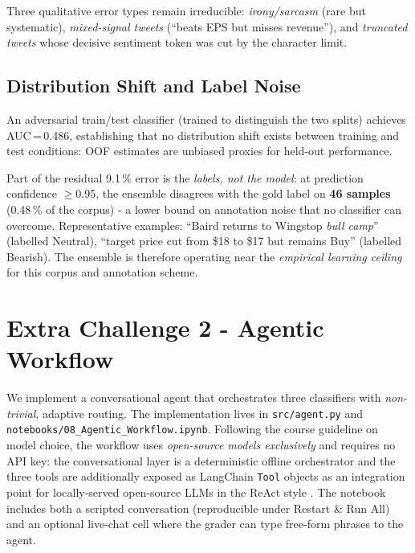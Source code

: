 \documentclass[11pt,a4paper]{article}
\begin{document}
Three qualitative error types remain irreducible: \emph{irony/sarcasm} (rare but
systematic), \emph{mixed-signal tweets} (``beats EPS but misses revenue''),
and \emph{truncated tweets} whose decisive sentiment token was cut by the character limit.

\subsection{Distribution Shift and Label Noise}
An adversarial train/test classifier (trained to distinguish the two splits) achieves
AUC\,=\,0.486, establishing that no distribution shift exists between training and test
conditions: OOF estimates are unbiased proxies for held-out performance.

Part of the residual 9.1\,\% error is the \emph{labels, not the model}: at prediction
confidence $\geq$0.95, the ensemble disagrees with the gold label on \textbf{46 samples}
(0.48\,\% of the corpus) - a lower bound on annotation noise that no classifier
can overcome. Representative examples: ``Baird returns to Wingstop \emph{bull camp}''
(labelled Neutral), ``target price cut from \$18 to \$17 but remains Buy'' (labelled Bearish).
The ensemble is therefore operating near the \emph{empirical learning ceiling} for this
corpus and annotation scheme.


\section{Extra Challenge 2 - Agentic Workflow}
We implement a conversational agent that orchestrates three classifiers with \emph{non-trivial},
adaptive routing. The implementation lives in \nolinkurl{src/agent.py} and
\nolinkurl{notebooks/08_Agentic_Workflow.ipynb}. Following the course guideline on model choice,
the workflow uses \emph{open-source models exclusively} and requires no API key: the
conversational layer is a deterministic offline orchestrator and the three tools are additionally
exposed as LangChain \texttt{Tool} objects as an integration point for locally-served open-source
LLMs in the ReAct style \cite{yao2022react}. The notebook includes both a scripted conversation
(reproducible under Restart \& Run All) and an optional live-chat cell where the grader can type
free-form phrases to the agent.
\end{document}
